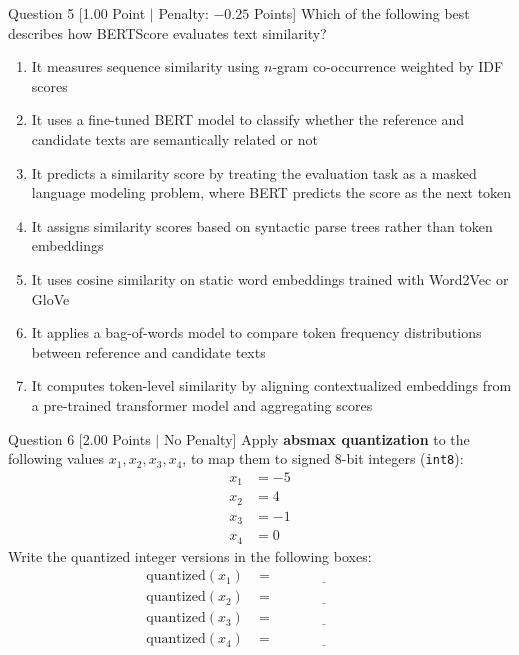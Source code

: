 \documentclass[11pt,a4paper]{article}
\begin{document}
\begin{questionbox}{Question 5 \hfill [1.00 Point $\vert$ Penalty: $-0.25$ Points]}
Which of the following best describes how BERTScore evaluates text similarity?
\begin{enumerate}[label=\alph*.,leftmargin=2em]
    \item It measures sequence similarity using $n$-gram co-occurrence weighted by IDF scores
    \item It uses a fine-tuned BERT model to classify whether the reference and candidate texts are semantically related or not
    \item It predicts a similarity score by treating the evaluation task as a masked language modeling problem, where BERT predicts the score as the next token
    \item It assigns similarity scores based on syntactic parse trees rather than token embeddings
    \item It uses cosine similarity on static word embeddings trained with Word2Vec or GloVe
    \item It applies a bag-of-words model to compare token frequency distributions between reference and candidate texts
    \item It computes token-level similarity by aligning contextualized embeddings from a pre-trained transformer model and aggregating scores
\end{enumerate}
\end{questionbox}

\begin{questionbox}{Question 6 \hfill [2.00 Points $\vert$ No Penalty]}
Apply \textbf{absmax quantization} to the following values $x_1, x_2, x_3, x_4$, to map them to signed 8-bit integers (\texttt{int8}):
\begin{align*}
    x_1 &= -5 \\
    x_2 &= 4 \\
    x_3 &= -1 \\
    x_4 &= 0
\end{align*}
Write the quantized integer versions in the following boxes:
\begin{align*}
    \text{quantized}(x_1) &= \underline{\hspace{3cm}} \\
    \text{quantized}(x_2) &= \underline{\hspace{3cm}} \\
    \text{quantized}(x_3) &= \underline{\hspace{3cm}} \\
    \text{quantized}(x_4) &= \underline{\hspace{3cm}}
\end{align*}
\end{questionbox}
\end{document}
